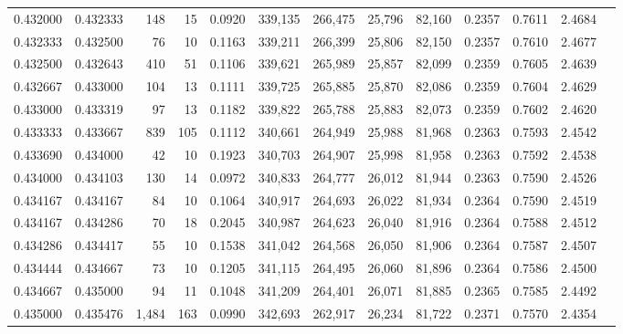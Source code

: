 \begin{tabular}{rrrrrrrrrrrrr}
0.432000 & 0.432333 &   148 &  15 &                                     0.0920 & 339,135 & 266,475 &  25,796 &  82,160 & 0.2357 & 0.7611 & 2.4684 \\
0.432333 & 0.432500 &    76 &  10 &                                     0.1163 & 339,211 & 266,399 &  25,806 &  82,150 & 0.2357 & 0.7610 & 2.4677 \\
0.432500 & 0.432643 &   410 &  51 &                                     0.1106 & 339,621 & 265,989 &  25,857 &  82,099 & 0.2359 & 0.7605 & 2.4639 \\
0.432667 & 0.433000 &   104 &  13 &                                     0.1111 & 339,725 & 265,885 &  25,870 &  82,086 & 0.2359 & 0.7604 & 2.4629 \\
0.433000 & 0.433319 &    97 &  13 &                                     0.1182 & 339,822 & 265,788 &  25,883 &  82,073 & 0.2359 & 0.7602 & 2.4620 \\
0.433333 & 0.433667 &   839 & 105 &                                     0.1112 & 340,661 & 264,949 &  25,988 &  81,968 & 0.2363 & 0.7593 & 2.4542 \\
0.433690 & 0.434000 &    42 &  10 &                                     0.1923 & 340,703 & 264,907 &  25,998 &  81,958 & 0.2363 & 0.7592 & 2.4538 \\
0.434000 & 0.434103 &   130 &  14 &                                     0.0972 & 340,833 & 264,777 &  26,012 &  81,944 & 0.2363 & 0.7590 & 2.4526 \\
0.434167 & 0.434167 &    84 &  10 &                                     0.1064 & 340,917 & 264,693 &  26,022 &  81,934 & 0.2364 & 0.7590 & 2.4519 \\
0.434167 & 0.434286 &    70 &  18 &                                     0.2045 & 340,987 & 264,623 &  26,040 &  81,916 & 0.2364 & 0.7588 & 2.4512 \\
0.434286 & 0.434417 &    55 &  10 &                                     0.1538 & 341,042 & 264,568 &  26,050 &  81,906 & 0.2364 & 0.7587 & 2.4507 \\
0.434444 & 0.434667 &    73 &  10 &                                     0.1205 & 341,115 & 264,495 &  26,060 &  81,896 & 0.2364 & 0.7586 & 2.4500 \\
0.434667 & 0.435000 &    94 &  11 &                                     0.1048 & 341,209 & 264,401 &  26,071 &  81,885 & 0.2365 & 0.7585 & 2.4492 \\
0.435000 & 0.435476 & 1,484 & 163 &                                     0.0990 & 342,693 & 262,917 &  26,234 &  81,722 & 0.2371 & 0.7570 & 2.4354 \\

\end{tabular}

